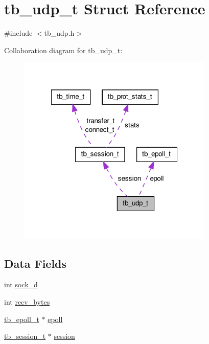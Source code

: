 \hypertarget{structtb__udp__t}{\section{tb\-\_\-udp\-\_\-t Struct Reference}
\label{structtb__udp__t}
}


{\ttfamily \#include $<$tb\-\_\-udp.\-h$>$}



Collaboration diagram for tb\-\_\-udp\-\_\-t\-:\nopagebreak
\begin{figure}[H]
\begin{center}
\leavevmode
\includegraphics[width=263pt]{structtb__udp__t__coll__graph}
\end{center}
\end{figure}
\subsection*{Data Fields}
\begin{DoxyCompactItemize}
\item 
int \hyperlink{structtb__udp__t_a94d540b145f21be2f9b28a2c225ccf30}{sock\-\_\-d}
\item 
int \hyperlink{structtb__udp__t_a720ac7ed925c17069fe94e7f7eab288b}{recv\-\_\-bytes}
\item 
\hyperlink{structtb__epoll__t}{tb\-\_\-epoll\-\_\-t} $\ast$ \hyperlink{structtb__udp__t_af7fbbda1b15f6051fb8cead0ada5ce7e}{epoll}
\item 
\hyperlink{structtb__session__t}{tb\-\_\-session\-\_\-t} $\ast$ \hyperlink{structtb__udp__t_af440bad4df83b8ff6504e90aa16ebc4c}{session}
\end{DoxyCompactItemize}


